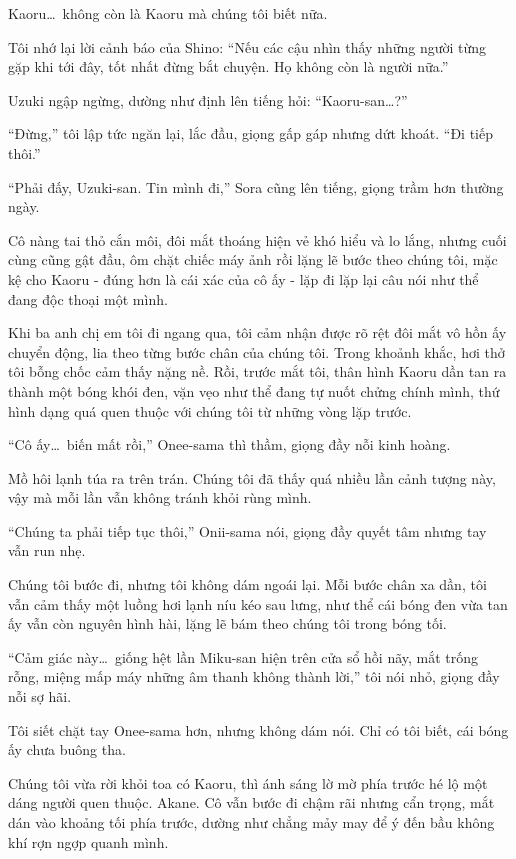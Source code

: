 \documentclass[../main.tex]{subfiles}
\begin{document}
Kaoru\dots\ không còn là Kaoru mà chúng tôi biết nữa.

Tôi nhớ lại lời cảnh báo của Shino: ``Nếu các cậu nhìn thấy những người từng gặp khi tới đây, tốt nhất đừng bắt chuyện. Họ không còn là người nữa.''

Uzuki ngập ngừng, dường như định lên tiếng hỏi: ``Kaoru-san\dots?''

``Đừng,'' tôi lập tức ngăn lại, lắc đầu, giọng gấp gáp nhưng dứt khoát. ``Đi tiếp thôi.''

``Phải đấy, Uzuki-san. Tin mình đi,'' Sora cũng lên tiếng, giọng trầm hơn thường ngày.

Cô nàng tai thỏ cắn môi, đôi mắt thoáng hiện vẻ khó hiểu và lo lắng, nhưng cuối cùng cũng gật đầu, ôm chặt chiếc máy ảnh rồi lặng lẽ bước theo chúng tôi, mặc kệ cho Kaoru - đúng hơn là cái xác của cô ấy - lặp đi lặp lại câu nói như thể đang độc thoại một mình.

Khi ba anh chị em tôi đi ngang qua, tôi cảm nhận được rõ rệt đôi mắt vô hồn ấy chuyển động, lia theo từng bước chân của chúng tôi. Trong khoảnh khắc, hơi thở tôi bỗng chốc cảm thấy nặng nề. Rồi, trước mắt tôi, thân hình Kaoru dần tan ra thành một bóng khói đen, vặn vẹo như thể đang tự nuốt chửng chính mình, thứ hình dạng quá quen thuộc với chúng tôi từ những vòng lặp trước.

``Cô ấy\dots\ biến mất rồi,'' Onee-sama thì thầm, giọng đầy nỗi kinh hoàng.

Mồ hôi lạnh túa ra trên trán. Chúng tôi đã thấy quá nhiều lần cảnh tượng này, vậy mà mỗi lần vẫn không tránh khỏi rùng mình.

``Chúng ta phải tiếp tục thôi,'' Onii-sama nói, giọng đầy quyết tâm nhưng tay vẫn run nhẹ.

Chúng tôi bước đi, nhưng tôi không dám ngoái lại. Mỗi bước chân xa dần, tôi vẫn cảm thấy một luồng hơi lạnh níu kéo sau lưng, như thể cái bóng đen vừa tan ấy vẫn còn nguyên hình hài, lặng lẽ bám theo chúng tôi trong bóng tối.

``Cảm giác này\dots\ giống hệt lần Miku-san hiện trên cửa sổ hồi nãy, mắt trống rỗng, miệng mấp máy những âm thanh không thành lời,'' tôi nói nhỏ, giọng đầy nỗi sợ hãi.

Tôi siết chặt tay Onee-sama hơn, nhưng không dám nói. Chỉ có tôi biết, cái bóng ấy chưa buông tha.

\ct

Chúng tôi vừa rời khỏi toa có Kaoru, thì ánh sáng lờ mờ phía trước hé lộ một dáng người quen thuộc. Akane. Cô vẫn bước đi chậm rãi nhưng cẩn trọng, mắt dán vào khoảng tối phía trước, dường như chẳng mảy may để ý đến bầu không khí rợn ngợp quanh mình.
\end{document}

